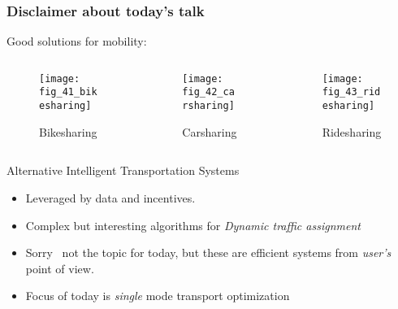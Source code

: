 \begin{frame}
\frametitle{Disclaimer about today's talk}
    Good solutions for mobility:
    \begin{center}
    \begin{columns}
        \begin{column}{0.3\textwidth}  
        \begin{figure}[htbp]
            \centering
            \texttt{[image: fig\_41\_bikesharing]}
            \caption{Bikesharing}
        \end{figure}
        \end{column}
        \begin{column}{0.3\textwidth}  
        \begin{figure}[htbp]
            \centering
            \texttt{[image: fig\_42\_carsharing]}          
            \caption{Carsharing}          
        \end{figure}
        \end{column}
        \begin{column}{0.3\textwidth}  
        \begin{figure}[htbp]
            \centering
            \texttt{[image: fig\_43\_ridesharing]} 
            \caption{Ridesharing}                                 
        \end{figure}
        \end{column}                
    \end{columns}
    \end{center}    
    \begin{exampleblock}{Alternative Intelligent Transportation Systems}
        \begin{itemize}
            \item Leveraged by data and incentives.
            \item Complex but interesting algorithms for \emph{Dynamic traffic assignment}
            \item Sorry \frownie\ not the topic for today, but these are efficient systems from \emph{user's} point of view.
            \item Focus of today is \emph{single} mode transport optimization 
        \end{itemize}
    \end{exampleblock}


\end{frame}